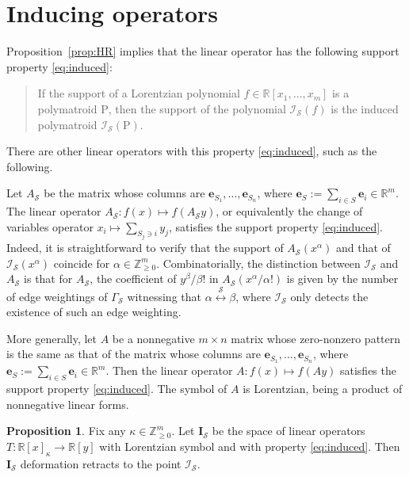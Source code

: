 \documentclass{amsart}
\newcommand{\RR}{\mathbb R}
\newcommand{\ZZ}{\mathbb Z}
\newcommand{\be}{\mathbf{e}}
\renewcommand{\P}{\mathrm{P}}
\theoremstyle{plain}
\theoremstyle{definition}
\newtheorem{prop}[thm]{Proposition}
\begin{document}
\section{Inducing operators}

Proposition~\ref{prop:HR} implies that the linear operator has the following support property \eqref{eq:induced}:
\begin{quote}
If the support of a Lorentzian polynomial $f\in \RR[x_1, \dotsc, x_m]$ is a polymatroid $\P$, then the support of the polynomial $\mathcal I_{\mathcal S}(f)$ is the induced polymatroid $\mathcal I_{\mathcal S}(\P)$.
\end{quote}
There are other linear operators with this property \eqref{eq:induced}, such as the following.


\smallskip
Let $A_{\mathcal S}$ be the matrix whose columns are $\be_{S_1},\dotsc, \be_{S_n}$, where $\be_S := \sum_{i\in S} \be_i \in \RR^m$.  The linear operator $A_{\mathcal S}: f(x) \mapsto f(A_{\mathcal S}y)$, or equivalently the change of variables operator $x_i \mapsto \sum_{S_j \ni i} y_j$, satisfies the support property \eqref{eq:induced}.  Indeed, it is straightforward to verify that the support of $A_{\mathcal S}(x^\alpha)$ and that of $\mathcal I_{\mathcal S}(x^\alpha)$ coincide for $\alpha \in \ZZ_{\geq 0}^m$.
Combinatorially, the distinction between $\mathcal I_{\mathcal S}$ and $A_{\mathcal S}$ is that for $A_{\mathcal S}$, the coefficient of $y^\beta/\beta!$ in $A_{\mathcal S}(x^\alpha/\alpha!)$ is given by the number of edge weightings of $\Gamma_{\mathcal S}$ witnessing that $\alpha \overset{\mathcal S}\longleftrightarrow \beta$, where $\mathcal I_{\mathcal S}$ only detects the existence of such an edge weighting.

\smallskip
More generally, let $A$ be a nonnegative $m\times n$ matrix whose zero-nonzero pattern is the same as that of the matrix whose columns are $\be_{S_1},\dotsc, \be_{S_n}$, where $\be_S := \sum_{i\in S} \be_i \in \RR^m$.  Then the linear operator $A: f(x) \mapsto f(Ay)$ satisfies the support property \eqref{eq:induced}.
The symbol of $A$ is Lorentzian, being a product of nonnegative linear forms.

\begin{prop}\label{prop:1param}
Fix any $\kappa\in \ZZ_{\geq 0}^m$.  Let $\mathbf I_{\mathcal S}$ be the space of linear operators $T: \RR[x]_\kappa \to \RR[y]$ with Lorentzian symbol and with property \eqref{eq:induced}.  Then $\mathbf I_{\mathcal S}$ deformation retracts to the point $\mathcal I_{\mathcal S}$.
\end{prop}
\end{document}
